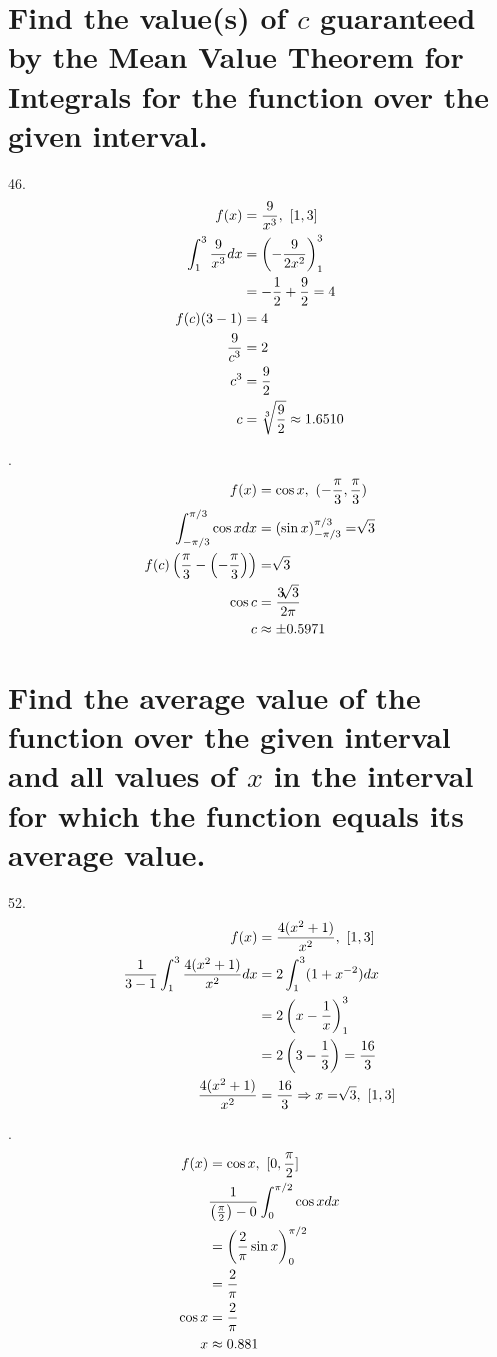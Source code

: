 \documentclass[11pt]{article}
\newcommand*{\vs}{\vspace{1cm}}
\newcommand*{\next}{\noindent}
\newcommand*{\set}{\setcounter{equation}{0}}
\newcommand*{\lt}{\left}
\newcommand*{\rt}{\right}
\begin{document}
\section{Find the value(s) of $c$ guaranteed by the
Mean Value Theorem for Integrals for the function over the
given interval.}
46.\begin{align}
    \set
    f(x)&=\frac{9}{x^3},\,\,[1, 3]\\
    \int_{1}^{3}\frac{9}{x^3}dx&=\lt(-\frac{9}{2x^2}\rt)_1^3\\
    &=-\frac{1}{2}+\frac{9}{2}=4\\
    f(c)(3-1)&=4\\
    \frac{9}{c^3}&=2\\
    c^3&=\frac{9}{2}\\
    c&=\sqrt[3]{\frac{9}{2}}\approx 1.6510
\end{align}

\vs\next
50.\begin{align}
    \set
    f(x)&=\cos x,\,\, (-\frac{\pi}{3}, \frac{\pi}{3})\\
    \int_{-\pi/3}^{\pi/3}\cos xdx&=(\sin x)_{-\pi/3}^{\pi/3}=\sqrt[]{3}\\
    f(c)\lt(\frac{\pi}{3}-\lt(-\frac{\pi}{3}\rt)\rt)&=\sqrt[]{3}\\
    \cos c&=\frac{3\sqrt[]{3}}{2\pi}\\
    c&\approx\pm 0.5971
\end{align}

\section{Find the average value of the function over
the given interval and all values of $x$ in the interval for which the
function equals its average value.}
52.\begin{align}
    \set
    f(x)&=\frac{4(x^2+1)}{x^2},\,\,[1, 3]\\
    \frac{1}{3-1}\int_{1}^{3}\frac{4(x^2+1)}{x^2}dx&=2\int_{1}^{3}(1+x^{-2})dx\\
    &=2\lt(x-\frac{1}{x}\rt)_1^3\\
    &=2\lt(3-\frac{1}{3}\rt)=\frac{16}{3}\\
    \frac{4(x^2+1)}{x^2}&=\frac{16}{3}\Rightarrow x=\sqrt[]{3},\,\,[1, 3]
\end{align}

\vs\next
56.\begin{align}
    \set
    f(x)&=\cos x,\,\,[0,\frac{\pi}{2}]\\
    &\frac{1}{\lt(\frac{\pi}{2}\rt)-0}\int_{0}^{\pi/2}\cos xdx\\
    &=\lt(\frac{2}{\pi}\sin x\rt)_0^{\pi/2}\\
    &=\frac{2}{\pi}\\
    \cos x&=\frac{2}{\pi}\\
    x&\approx 0.881
\end{align}
\end{document}
